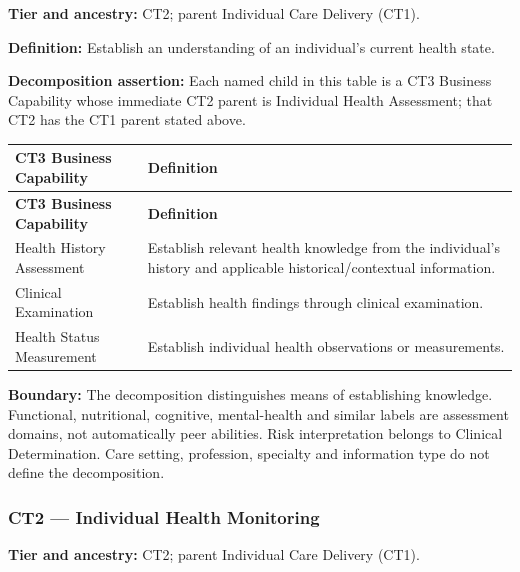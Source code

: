 \textbf{Tier and ancestry:} CT2; parent Individual Care Delivery (CT1).

\label{rad:business:320}

\textbf{Definition:} Establish an understanding of an individual’s current health state.

\label{rad:business:322}

\textbf{Decomposition assertion:} Each named child in this table is a CT3 Business Capability whose immediate CT2 parent is Individual Health Assessment; that CT2 has the CT1 parent stated above.

\label{rad:business:324}
\begingroup\small\setlength{\TableWidth}{\dimexpr\linewidth-4\tabcolsep-3\arrayrulewidth\relax}
\begin{longtable}{|>{\raggedright\arraybackslash}p{0.35\TableWidth}|>{\raggedright\arraybackslash}p{0.65\TableWidth}|}
\hline\rowcolor{TableHead}\textbf{CT3 Business Capability} & \textbf{Definition}\\\hline\endfirsthead
\hline\rowcolor{TableHead}\textbf{CT3 Business Capability} & \textbf{Definition}\\\hline\endhead
\hline\endfoot
Health History Assessment & Establish relevant health knowledge from the individual’s history and applicable historical/\allowbreak{}contextual information.\\\hline
Clinical Examination & Establish health findings through clinical examination.\\\hline
Health Status Measurement & Establish individual health observations or measurements.\\\hline
\end{longtable}\endgroup
{}\label{rad:business:330}

\textbf{Boundary:} The decomposition distinguishes means of establishing knowledge. Functional, nutritional, cognitive, mental-health and similar labels are assessment domains, not automatically peer abilities. Risk interpretation belongs to Clinical Determination. Care setting, profession, specialty and information type do not define the decomposition.

\label{rad:business:332}
\subsubsection*{CT2 — Individual Health Monitoring}
\label{rad:business:334}

\textbf{Tier and ancestry:} CT2; parent Individual Care Delivery (CT1).

